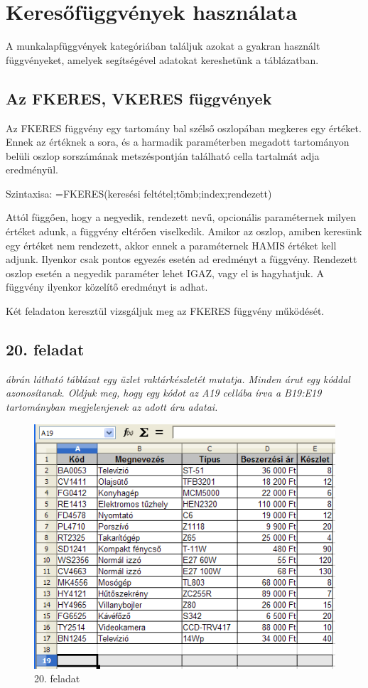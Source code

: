 \chapter{Keresőfüggvények használata}
\thispagestyle{empty}

A munkalapfüggvények kategóriában találjuk azokat a gyakran
használt függvényeket, amelyek segítségével adatokat
kereshetünk a táblázatban. 

\section{Az FKERES, VKERES függvények}

Az FKERES függvény egy tartomány bal szélső oszlopában
megkeres egy értéket. Ennek az értéknek a sora, és a harmadik
paraméterben megadott tartományon belüli oszlop sorszámának
metszéspontján található cella tartalmát adja eredményül.

Szintaxisa: =FKERES(keresési feltétel;tömb;index;rendezett)

Attól függően, hogy a negyedik, rendezett nevű, opcionális
paraméternek milyen értéket adunk, a függvény eltérően
viselkedik. Amikor az oszlop, amiben keresünk egy értéket nem
rendezett, akkor ennek a paraméternek HAMIS értéket kell adjunk.
Ilyenkor csak pontos egyezés esetén ad eredményt a függvény.
Rendezett oszlop esetén a negyedik paraméter lehet IGAZ, vagy el is
hagyhatjuk. A függvény ilyenkor közelítő eredményt is
adhat. 

Két feladaton keresztül vizsgáljuk meg az FKERES függvény
működését.


\section{20. feladat}

{\itshape
{} ábrán látható táblázat egy üzlet
raktárkészletét mutatja. Minden árut egy kóddal
azonosítanak. Oldjuk meg, hogy egy kódot az A19 cellába írva a
B19:E19 tartományban megjelenjenek az adott áru adatai.}

\begin{figure}[!h]
\begin{center}
\includegraphics[width=11.804cm]{oocalcv2-img94.png}
\caption{20. feladat}\label{20-feladat}
\end{center}
\end{figure}

